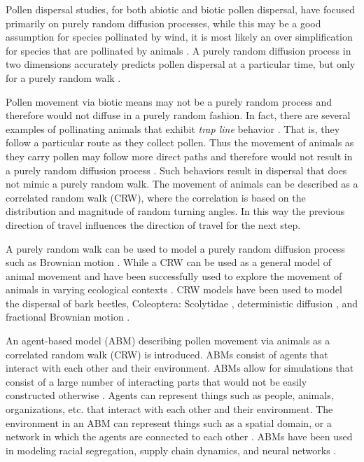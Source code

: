 \documentclass[preprint,12pt]{elsarticle}
\numberwithin{equation}{subsection}
\begin{document}
Pollen dispersal studies, for both abiotic and biotic pollen dispersal, have
focused primarily on purely random diffusion processes, while this may be a good
assumption for species pollinated by wind, it is most likely an over
simplification for species that are pollinated by animals \cite{Chan}. A purely
random diffusion process in two dimensions accurately predicts pollen dispersal
at a particular time, but only for a purely random walk \cite{Byers01}.

Pollen movement via biotic means may not be a purely random process and
therefore would not diffuse in a purely random fashion. In fact, there are
several examples of pollinating animals that exhibit \emph{trap line} behavior
\cite{Chan}. That is, they follow a particular route as they collect pollen.
Thus the movement of animals as they carry pollen may follow more direct paths
and therefore would not result in a purely random diffusion process
\cite{Cresswell03}. Such behaviors result in dispersal that does not mimic a
purely random walk. The movement of animals can be described as a correlated
random walk (CRW), where the correlation is based on the distribution and
magnitude of random turning angles. In this way the previous direction of travel
influences the direction of travel for the next step.

A purely random walk can be used to model a purely random diffusion process such
as Brownian motion \cite{Codling}. While a CRW can be used as a general model of
animal movement \cite{Prasad05} and have been successfully used to explore the
movement of animals in varying ecological contexts \cite{Bartumeus07}. CRW
models have been used to model the dispersal of bark beetles, Coleoptera:
Scolytidae \cite{Byers01}, deterministic diffusion \cite{Klages}, and fractional
Brownian motion \cite{Enriquez}.

An agent-based model (ABM) describing pollen movement via animals as a
correlated random walk (CRW) is introduced. ABMs consist of agents that interact
with each other and their environment. ABMs allow for simulations that consist
of a large number of interacting parts that would not be easily constructed
otherwise \cite{Fioretti05}. Agents can represent things such as people, animals,
organizations, etc. that interact with each other and their environment. The
environment in an ABM can represent things such as a spatial domain, or a
network in which the agents are connected to each other \cite{Gilbert}. ABMs
have been used in modeling racial segregation, supply chain dynamics, and neural
networks \cite{Gilbert}.
\end{document}
